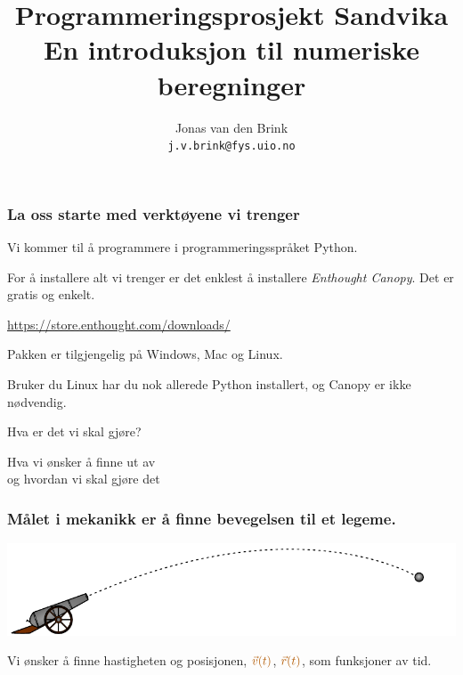 \documentclass[english, 12pt]{beamer}
\title{Programmeringsprosjekt Sandvika \\ {\small En introduksjon til numeriske beregninger}}
\author{Jonas van den Brink \\ \texttt{j.v.brink@fys.uio.no}}
\institute{\alrt Simula Research Laboratory \\ Oslo, Norway}
\newcommand{\alrt}{\color{AlertColor}}
\begin{document}
\pagestyle{empty}

\begin{frame}
\maketitle 
\end{frame}

\begin{frame}[fragile]
\frametitle{La oss starte med verktøyene vi trenger}

Vi kommer til å programmere i programmeringsspråket {\alrt Python}.

 {
	
For å installere alt vi trenger er det enklest å installere \emph{\alrt Enthought Canopy}. Det er gratis og enkelt.

{\color{DarkFern} \url{https://store.enthought.com/downloads/}}

Pakken er tilgjengelig på Windows, Mac og Linux.
}

\vspace{1cm}

 {
Bruker du Linux har du nok allerede Python installert, og Canopy er ikke nødvendig.	
}
\end{frame}



\begin{frame}[fragile]
\begin{center}
{\Huge \color{DarkFern} Hva er det vi skal gjøre?}

\vspace{1cm}

Hva vi ønsker å finne ut av \\ og hvordan vi skal gjøre det
\end{center}
\end{frame}

\begin{frame}[fragile]
\frametitle{Målet i mekanikk er å finne bevegelsen til et legeme.}

\begin{center}
\includegraphics[width=\textwidth]{cannonball}
\end{center}

\vspace{1cm}

Vi ønsker å finne hastigheten og posisjonen, $\alrt \vec{v}(t)$, $\alrt \vec{r}(t)$, som funksjoner av tid.

\end{frame}
\end{document}
